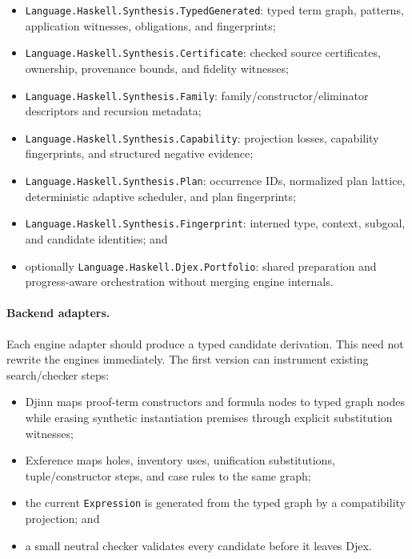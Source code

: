 \documentclass[11pt]{article}
\newcommand{\code}[1]{\texttt{#1}}
\newcommand{\Djex}{\textsf{Djex}}
\newcommand{\Djinn}{Djinn}
\newcommand{\Exference}{Exference}
\begin{document}
\begin{itemize}
  \item \code{Language.Haskell.Synthesis.TypedGenerated}: typed term graph,
    patterns, application witnesses, obligations, and fingerprints;
  \item \code{Language.Haskell.Synthesis.Certificate}: checked source
    certificates, ownership, provenance bounds, and fidelity witnesses;
  \item \code{Language.Haskell.Synthesis.Family}: family/constructor/eliminator
    descriptors and recursion metadata;
  \item \code{Language.Haskell.Synthesis.Capability}: projection losses,
    capability fingerprints, and structured negative evidence;
  \item \code{Language.Haskell.Synthesis.Plan}: occurrence IDs, normalized
    plan lattice, deterministic adaptive scheduler, and plan fingerprints;
  \item \code{Language.Haskell.Synthesis.Fingerprint}: interned type, context,
    subgoal, and candidate identities; and
  \item optionally \code{Language.Haskell.Djex.Portfolio}: shared preparation
    and progress-aware orchestration without merging engine internals.
\end{itemize}

\paragraph{Backend adapters.}

Each engine adapter should produce a typed candidate derivation.  This need not
rewrite the engines immediately.  The first version can instrument existing
search/checker steps:

\begin{itemize}
  \item \Djinn{} maps proof-term constructors and formula nodes to typed graph
    nodes while erasing synthetic instantiation premises through explicit
    substitution witnesses;
  \item \Exference{} maps holes, inventory uses, unification substitutions,
    tuple/constructor steps, and case rules to the same graph;
  \item the current \code{Expression} is generated from the typed graph by a
    compatibility projection; and
  \item a small neutral checker validates every candidate before it leaves
    \Djex{}.
\end{itemize}
\end{document}
